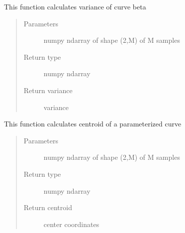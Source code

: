 \documentclass[letterpaper,10pt,english]{sphinxmanual}
\begin{document}

\begin{fulllineitems}
\label{\detokenize{curve_functions:curve_functions.calculate_variance}}
This function calculates variance of curve beta
\begin{quote}\begin{description}
\item[{Parameters}] \leavevmode
{} \textendash{} numpy ndarray of shape (2,M) of M samples

\item[{Return type}] \leavevmode
numpy ndarray

\item[{Return variance}] \leavevmode
variance

\end{description}\end{quote}

\end{fulllineitems}


\begin{fulllineitems}
\label{\detokenize{curve_functions:curve_functions.calculatecentroid}}
This function calculates centroid of a parameterized curve
\begin{quote}\begin{description}
\item[{Parameters}] \leavevmode
{} \textendash{} numpy ndarray of shape (2,M) of M samples

\item[{Return type}] \leavevmode
numpy ndarray

\item[{Return centroid}] \leavevmode
center coordinates

\end{description}\end{quote}

\end{fulllineitems}
\end{document}
